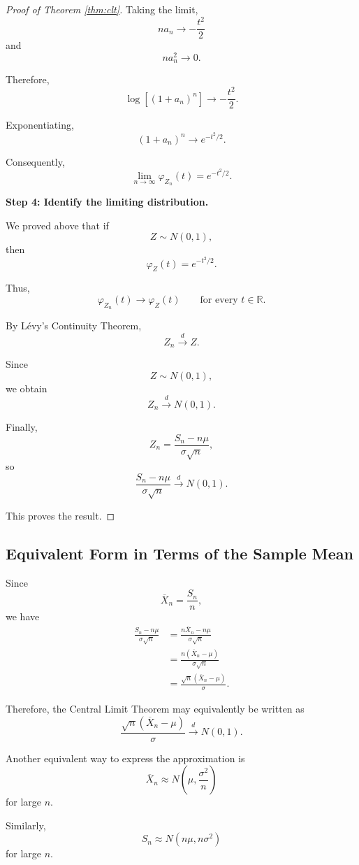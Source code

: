\documentclass[11pt]{article}
\theoremstyle{definition}
\theoremstyle{plain}
\theoremstyle{remark}
\begin{document}
\begin{proof}[Proof of Theorem \ref{thm:clt}]
Taking the limit,
\[
na_n\to-\frac{t^2}{2}
\]
and
\[
na_n^2\to0.
\]

Therefore,
\[
\log\left[(1+a_n)^n\right]
\to
-\frac{t^2}{2}.
\]

Exponentiating,
\[
(1+a_n)^n
\to
e^{-t^2/2}.
\]

Consequently,
\[
\lim_{n\to\infty}\varphi_{Z_n}(t)
=
e^{-t^2/2}.
\]

\medskip

\noindent
\textbf{Step 4: Identify the limiting distribution.}

We proved above that if
\[
Z\sim N(0,1),
\]
then
\[
\varphi_Z(t)
=
e^{-t^2/2}.
\]

Thus,
\[
\varphi_{Z_n}(t)
\longrightarrow
\varphi_Z(t)
\qquad
\text{for every }t\in\mathbb{R}.
\]

By L\'evy's Continuity Theorem,
\[
Z_n\xrightarrow{d}Z.
\]

Since
\[
Z\sim N(0,1),
\]
we obtain
\[
Z_n\xrightarrow{d}N(0,1).
\]

Finally,
\[
Z_n
=
\frac{S_n-n\mu}{\sigma\sqrt{n}},
\]
so
\[
\frac{S_n-n\mu}{\sigma\sqrt{n}}
\xrightarrow{d}
N(0,1).
\]

This proves the result.
\end{proof}


\subsection*{Equivalent Form in Terms of the Sample Mean}

Since
\[
\overline{X}_n
=
\frac{S_n}{n},
\]
we have
\begin{align*}
\frac{S_n-n\mu}{\sigma\sqrt{n}}
&=
\frac{
n\overline{X}_n-n\mu
}{
\sigma\sqrt{n}
}
\\
&=
\frac{
n(\overline{X}_n-\mu)
}{
\sigma\sqrt{n}
}
\\
&=
\frac{
\sqrt{n}(\overline{X}_n-\mu)
}{
\sigma
}.
\end{align*}

Therefore, the Central Limit Theorem may equivalently be written as
\[
\frac{
\sqrt{n}(\overline{X}_n-\mu)
}{
\sigma
}
\xrightarrow{d}
N(0,1).
\]

Another equivalent way to express the approximation is
\[
\overline{X}_n
\approx
N\left(
\mu,\frac{\sigma^2}{n}
\right)
\]
for large $n$.

Similarly,
\[
S_n
\approx
N(n\mu,n\sigma^2)
\]
for large $n$.
\end{document}
